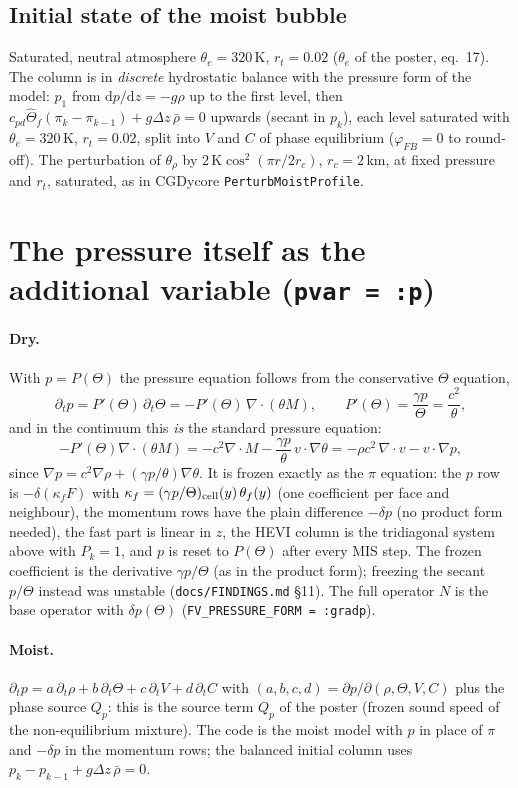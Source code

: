 \documentclass[11pt,a4paper]{article}
\newcommand{\code}[1]{\texttt{#1}}
\begin{document}
\subsection{Initial state of the moist bubble}
Saturated, neutral atmosphere $\theta_e=320$\,K, $r_t=0.02$ ($\theta_e$ of the poster, eq.~17). The
column is in \emph{discrete} hydrostatic balance with the pressure form of the model:
$p_1$ from $\mathrm dp/\mathrm dz=-g\rho$ up to the first level, then
$c_{pd}\hat\Theta_f(\pi_k-\pi_{k-1})+g\Delta z\,\bar\rho=0$ upwards (secant in $p_k$), each level
saturated with $\theta_e=320$\,K, $r_t=0.02$, split into $V$ and $C$ of phase equilibrium ($\varphi_{FB}=0$ to
round-off). The perturbation of $\theta_\rho$ by
$2\,\mathrm K\cos^2(\pi r/2r_c)$, $r_c=2$\,km, at fixed pressure and $r_t$, saturated, as in CGDycore
\code{PerturbMoistProfile}.

\section{The pressure itself as the additional variable (\code{pvar = :p})}
\paragraph{Dry.} With $p=P(\Theta)$ the pressure equation follows from the conservative $\Theta$ equation,
\[
\partial_t p=P'(\Theta)\,\partial_t\Theta=-P'(\Theta)\,\nabla\cdot(\theta M),\qquad P'(\Theta)=\frac{\gamma p}{\Theta}=\frac{c^2}{\theta},
\]
and in the continuum this \emph{is} the standard pressure equation:
\[
-P'(\Theta)\nabla\cdot(\theta M)=-c^2\nabla\cdot M-\frac{\gamma p}{\theta}\,v\cdot\nabla\theta
=-\rho c^2\,\nabla\cdot v-v\cdot\nabla p,
\]
since $\nabla p=c^2\nabla\rho+(\gamma p/\theta)\nabla\theta$. It is frozen exactly as the $\pi$ equation:
the $p$ row is $-\delta(\kappa_fF)$ with $\kappa_f=(\gamma p/\Theta)_{\rm cell}(y)\,\theta_f(y)$ (one
coefficient per face and neighbour), the momentum rows have the plain difference $-\delta p$ (no product
form needed), the fast part is linear in $z$, the HEVI column is the tridiagonal system above with
$P_k=1$, and $p$ is reset to $P(\Theta)$ after every MIS step. The frozen coefficient is the derivative
$\gamma p/\Theta$ (as in the product form); freezing the secant $p/\Theta$ instead was unstable
(\code{docs/FINDINGS.md} \S11). The full operator $N$ is the base operator with $\delta p(\Theta)$
(\code{FV\_PRESSURE\_FORM = :gradp}).

\paragraph{Moist.} $\partial_t p=a\,\partial_t\rho+b\,\partial_t\Theta+c\,\partial_tV+d\,\partial_tC$ with
$(a,b,c,d)=\partial p/\partial(\rho,\Theta,V,C)$ plus the phase source $Q_p$:
this is the source term $Q_p$ of the poster (frozen sound speed of the non-equilibrium mixture). The code is the moist
model with $p$ in place of $\pi$ and $-\delta p$ in the momentum rows; the balanced initial column uses
$p_k-p_{k-1}+g\Delta z\,\bar\rho=0$.
\end{document}
